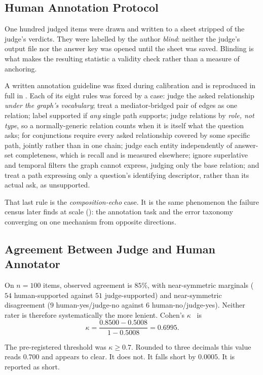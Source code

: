 \subsection{Human Annotation Protocol}

One hundred judged items were drawn and written to a sheet stripped of the
judge's verdicts. They were labelled by the author \emph{blind}: neither the
judge's output file nor the answer key was opened until the sheet was saved.
Blinding is what makes the resulting statistic a validity check rather than a
measure of anchoring.

A written annotation guideline was fixed during calibration and is reproduced in
full in . Each of its eight rules was forced by a case:
judge the asked relationship \emph{under the graph's vocabulary}; treat a
mediator-bridged pair of edges as one relation; label supported if \emph{any}
single path supports; judge relations by \emph{role, not type}, so a
normally-generic relation counts when it is itself what the question asks; for
conjunctions require every asked relationship covered by some specific path,
jointly rather than in one chain; judge each entity independently of answer-set
completeness, which is recall and is measured elsewhere; ignore superlative and
temporal filters the graph cannot express, judging only the base relation; and
treat a path expressing only a question's identifying descriptor, rather than
its actual ask, as unsupported.

That last rule is the \emph{composition-echo} case. It is the same
phenomenon the failure census later finds at scale (): the
annotation task and the error taxonomy converging on one mechanism from opposite
directions.

\subsection{Agreement Between Judge and Human Annotator}

On $n = 100$ items, observed agreement is $85\%$, with near-symmetric
marginals ($54$ human-supported against $51$
judge-supported) and near-symmetric disagreement ($9$ human-yes/judge-no against
$6$ human-no/judge-yes). Neither rater is therefore systematically the more
lenient. Cohen's $\kappa$~\cite{cohen1960coefficient} is \[ \kappa =
\frac{0.8500 - 0.5008}{1 - 0.5008} = 0.6995 . \]

The pre-registered threshold was $\kappa \geq 0.7$. Rounded to three decimals
this value reads $0.700$ and appears to clear. It does not. It falls short by
$0.0005$. It is reported as short.

